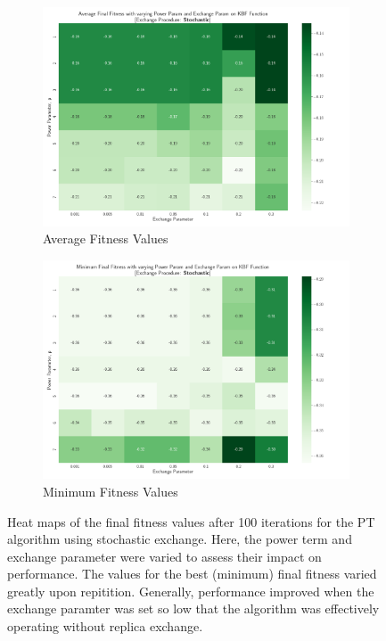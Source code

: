 \documentclass[10pt]{article}
\begin{document}
\begin{multicols}{2}
\begin{figure}[H]
    \centering
    \begin{subfigure}{0.48\textwidth}
        \centering
        \includegraphics[width=\textwidth]{../figures/Permanent Images/PT_Avg_Fitness_Heatmap_Stochastic.png}
        \caption{Average Fitness Values}
        \label{fig:avg_stochastic_heatmap}
    \end{subfigure}
    \begin{subfigure}{0.48\textwidth}
        \centering
        \includegraphics[width=\textwidth]{../figures/Permanent Images/PT_Min_Fitness_Heatmap_Stochastic.png}
        \caption{Minimum Fitness Values}
        \label{fig:min_stochastic_heatmap}
    \end{subfigure}
    \captionsetup{justification=centering}
    \caption{Heat maps of the final fitness values after 100 iterations for the PT algorithm using stochastic exchange. Here, the power term and exchange parameter were varied to assess their impact on performance. The values for the best (minimum) final fitness varied greatly upon repitition. Generally, performance improved when the exchange paramter was set so low that the algorithm was effectively operating without replica exchange.}
    \label{fig:heatmap_stochastic}
\end{figure}
\end{multicols}
\end{document}
